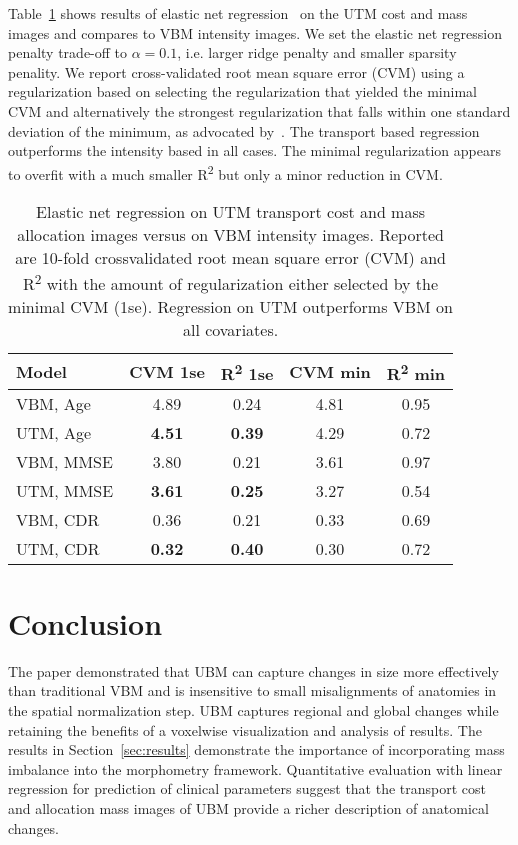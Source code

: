 \documentclass{llncs}
\begin{document}
Table~\ref{fig:prediction} shows results of elastic net
regression~\cite{Zou05regularizationand} on the UTM cost and mass images and
compares to VBM intensity images. We set the elastic net regression penalty
trade-off to $\alpha=0.1$, i.e. larger ridge penalty and smaller sparsity
penality. We report cross-validated root mean square error (CVM) using a
regularization based on selecting the regularization that yielded the minimal
CVM and alternatively the strongest regularization that falls within one
standard deviation of the minimum, as advocated
by~\cite{Zou05regularizationand}. The transport based regression outperforms
the intensity based in all cases.  The minimal regularization appears to
overfit with a much smaller R\textsuperscript{2}  but only a minor reduction in
CVM.  
\begin{table}[h!]
\centering
\begin{tabular}{l|cc|cc}
  \parbox[b][4mm]{25mm }{Model  }  &
  \parbox[b][4mm]{15mm }{\centering CVM 1se }  & 
  \parbox[b][4mm]{15mm }{\centering R\textsuperscript{2}  1se} & 
  \parbox[b][4mm]{15mm }{\centering CVM min }  & 
  \parbox[b][4mm]{15mm }{\centering R\textsuperscript{2}  min} 
        \\ \hline \hline
  VBM, Age   & 4.89        & 0.24         & 4.81  & 0.95 \\
  UTM, Age   & {\bf 4.51}  & {\bf 0.39 }  & 4.29  & 0.72 \\ \hline
  VBM, MMSE  & 3.80        & 0.21         & 3.61  & 0.97 \\
  UTM, MMSE  & {\bf3.61 }  & {\bf 0.25}   & 3.27  & 0.54 \\ \hline
  VBM, CDR   & 0.36        & 0.21         & 0.33  & 0.69 \\
  UTM, CDR   & {\bf 0.32 } & {\bf 0.40 }  & 0.30  & 0.72 \\
\end{tabular} 
\caption{ \label{fig:prediction}  Elastic net regression on UTM transport cost
  and mass allocation images versus on VBM intensity images. Reported are
  10-fold crossvalidated root mean square error (CVM) and R\textsuperscript{2}
  with the amount of regularization either selected by the minimal CVM (1se).
  Regression on UTM outperforms VBM on all covariates.
  \vspace{-10mm}}
\end{table}


\section{Conclusion}
The paper demonstrated that UBM can capture changes in size more effectively
than traditional VBM and is insensitive to small misalignments of anatomies in
the spatial normalization step. UBM captures regional and global changes while
retaining the benefits of a voxelwise visualization and analysis of results.
The results in Section~\ref{sec:results} demonstrate the importance of
incorporating mass imbalance into the morphometry framework.  Quantitative
evaluation with linear regression for prediction of clinical parameters suggest
that the transport cost and allocation mass images of UBM provide a richer
description of anatomical changes.
\end{document}
